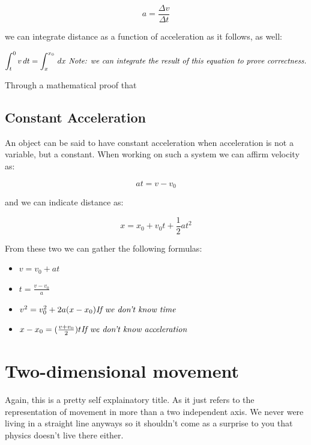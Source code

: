 \documentclass[11pt,fleqn]{book} %
\begin{document}
\begin{equation}
    a = \frac{\Delta v}{\Delta t}
\end{equation}

we can integrate distance as a function of acceleration as it follows, as well:

\begin{equation}
    \int_{t}^{0} v \,dt = \int_{x}^{x_0} \,dx \\ \text{\textit{ Note: we can integrate the result of this equation to prove correctness.}}
\end{equation}

Through a mathematical proof that 

\subsection{Constant Acceleration}

An object can be said to have constant acceleration when acceleration is not a variable, but a 
constant. When working on such a system we can affirm velocity as:

\begin{equation}
    at = v - v_0
\end{equation}

and we can indicate distance as:

\begin{equation}
    x = x_0 + v_0 t + \frac{1}{2} at^2
\end{equation}

From these two we can gather the following formulas:

\begin{itemize}
    \item $v = v_0 + at$
    \item $t = \frac{v-v_0}{a}$
    \item $ v^2 = v^2_0 + 2a(x-x_0) \text{\textit{If we don't know time}} $
    \item $ x - x_0 = (\frac{v+v_0}{2})t \text{\textit{If we don't know acceleration}} $
\end{itemize}

\section{Two-dimensional movement}

Again, this is a pretty self explainatory title. As it just refers to the
representation of movement in more than a two independent axis. We never were
living in a straight line anyways so it shouldn't come as a surprise to you that 
physics doesn't live there either. 
\end{document}
